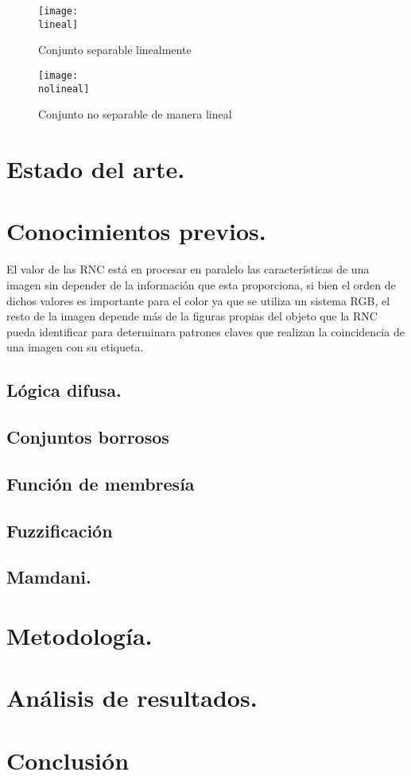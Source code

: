 \documentclass[a4paper, 12pt]{article}
\newcommand{\lineal}{img/lineal.png}
\newcommand{\nolineal}{img/nol.png}
\begin{document}
    \begin{figure}[H]
        \centering
        \texttt{[image: \\lineal]}
        \caption{Conjunto separable linealmente}
        \label{fig:lin}
    \end{figure}

    \begin{figure}[H]
        \centering
        \texttt{[image: \\nolineal]}
        \caption{Conjunto no separable de manera lineal}
        \label{fig:nolin}
    \end{figure}

    \section{Estado del arte.}

    

    \section{Conocimientos previos.}
    El valor de las RNC está en procesar en paralelo las características de una imagen sin depender de la información que esta proporciona, si bien el orden de dichos valores es importante para el color ya que se utiliza un sistema RGB, el resto de la imagen depende más de la figuras propias del objeto que la RNC pueda identificar para determinara patrones claves que realizan la coincidencia de una imagen con su etiqueta.


    \subsection{Lógica difusa.}

    \subsection{Conjuntos borrosos}

    \subsection{Función de membresía}

    \subsection{Fuzzificación}

    \subsection{Mamdani.}

    \section{Metodología.}

    \section{Análisis de resultados.}

    \section{Conclusión}
\end{document}
